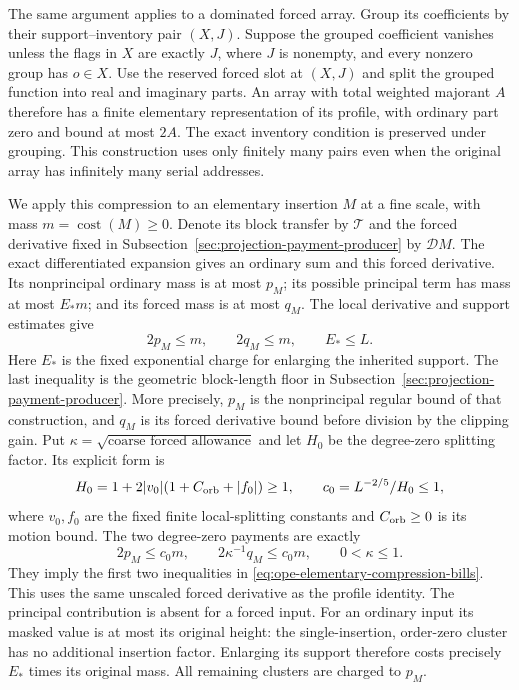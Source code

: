 The same argument applies to a dominated forced array. Group its
coefficients by their support--inventory pair $(X,J)$. Suppose the
grouped coefficient vanishes unless the flags in $X$ are exactly $J$,
where $J$ is nonempty, and every nonzero group has $o\in X$.
Use the reserved forced slot at $(X,J)$ and split the grouped function
into real and imaginary parts. An array with total weighted majorant
$A$ therefore has a finite elementary representation of its profile,
with ordinary part zero and bound at most $2A$. The exact inventory
condition is preserved under grouping. This construction uses only
finitely many pairs even when the original array has infinitely many
serial addresses.

We apply this compression to an elementary insertion $M$ at a fine
scale, with mass $m=\operatorname{cost}(M)\ge0$. Denote its block
transfer by $\mathcal T$ and the forced derivative fixed in
Subsection~\ref{sec:projection-payment-producer} by $\mathcal D M$.
The exact differentiated expansion gives an ordinary sum and this
forced derivative. Its nonprincipal ordinary mass is at most $p_M$;
its possible principal term has mass at most $E_*m$; and its forced
mass is at most $q_M$. The local derivative and support estimates give
\begin{equation}\label{eq:ope-elementary-compression-bills}
           2p_M\le m,\qquad 2q_M\le m,\qquad E_*\le L.
\end{equation}
Here $E_*$ is the fixed exponential charge for enlarging the inherited
support. The last inequality is the geometric block-length floor in
Subsection~\ref{sec:projection-payment-producer}. More precisely, $p_M$
is the nonprincipal regular bound of that construction, and $q_M$
is its forced derivative bound before division by the clipping gain.
Put $\kappa=\sqrt{\text{coarse forced allowance}}$ and let $H_0$
be the degree-zero splitting factor. Its explicit form is
\[
 H_0=1+2|v_0|(1+C_{\rm orb}+|f_0|)\ge1,
 \qquad c_0=L^{-2/5}/H_0\le1,
\]
where $v_0,f_0$ are the fixed finite local-splitting constants and
$C_{\rm orb}\ge0$ is its motion bound. The two degree-zero payments
are exactly
\[
          2p_M\le c_0m,\qquad
          2\kappa^{-1}q_M\le c_0m,
                       \qquad 0<\kappa\le1.
\]
They imply the first two inequalities in
\eqref{eq:ope-elementary-compression-bills}. This uses the same
unscaled forced derivative as the profile identity. The principal contribution
is absent for a forced input. For an ordinary input its masked value
is at most its original height: the single-insertion, order-zero
cluster has no additional insertion factor. Enlarging its support
therefore costs precisely $E_*$ times its original mass. All remaining
clusters are charged to $p_M$.

